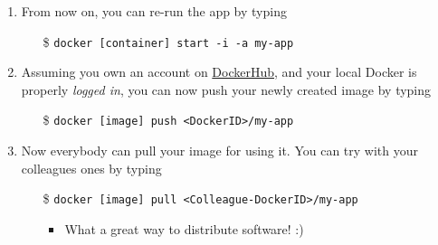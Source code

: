 \documentclass{beamer}\mode<presentation>{\usetheme{AMSBolognaFC}}
\begin{document}
\begin{frame}[allowframebreaks]
\begin{enumerate}
        \framebreak

        \item From now on, you can re-run the app by typing
        \begin{itemize}
            \item[\$] \texttt{docker [container] \alert{start} -i -a my-app}
        \end{itemize}

        \item Assuming you own an account on \href{https://hub.docker.com/}{DockerHub}, and your local Docker is properly \emph{logged in}, you can now \alert{push} your newly created image by typing
        \begin{itemize}
            \item[\$] \texttt{docker [image] \alert{push} <DockerID>/my-app}
        \end{itemize}

        \item Now everybody can \alert{pull} your image for using it. You can try with your colleagues ones by typing
        \begin{itemize}
            \item[\$] \texttt{docker [image] \alert{pull} <Colleague-DockerID>/my-app}
            \begin{itemize}
                \item What a great way to distribute software! :)
            \end{itemize}
        \end{itemize}

    \end{enumerate}

\end{frame}

%
%
%
%
%
\end{document}
